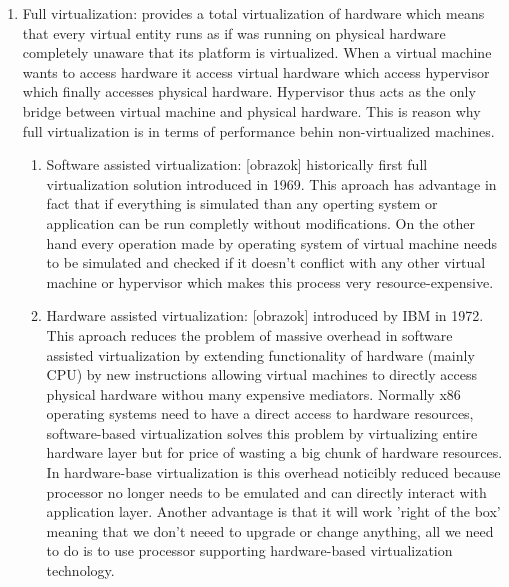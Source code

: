 \begin{itemize}
\begin{enumerate}
\item Full virtualization:  provides a total virtualization of hardware which means that every virtual entity runs as if was running on physical hardware completely unaware that its platform is virtualized. When a virtual machine wants to access hardware it access virtual hardware which access hypervisor which finally accesses physical hardware. Hypervisor thus acts as the only bridge between virtual machine and physical hardware. This is reason why full virtualization is in terms of performance behin non-virtualized machines.
\begin{enumerate}
\item Software assisted virtualization: [obrazok] historically first full virtualization solution introduced in 1969. This aproach has advantage in fact that if everything is simulated than any operting system or application can be run completly without modifications. On the other hand every operation made by operating system of virtual machine needs to be simulated and checked if it doesn't conflict with any other virtual machine or hypervisor which makes this process very resource-expensive.
\item Hardware assisted virtualization: [obrazok] introduced by IBM in 1972. This aproach reduces the problem of massive overhead in software assisted virtualization by extending functionality of hardware (mainly CPU) by new instructions allowing virtual machines to directly access physical hardware withou many expensive mediators. Normally x86 operating systems need to have a direct access to hardware resources, software-based virtualization solves this problem by virtualizing entire hardware layer but for price of wasting a big chunk of hardware resources. In hardware-base virtualization is this overhead noticibly reduced because processor no longer needs to be emulated and can directly interact with application layer. Another advantage is that it will work 'right of the box' meaning that we don't neeed to upgrade or change anything, all we need to do is to use processor supporting hardware-based virtualization technology.
\end{enumerate}


\end{enumerate}
\end{itemize}
